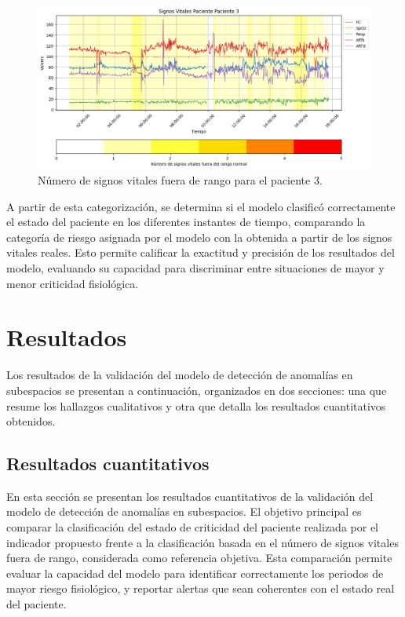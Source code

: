 \begin{figure}[H]
  \centering
  \includegraphics[width=\textwidth]{Images/patient3_signos_vitales_fuera_de_rango_2.png}
  \caption{Número de signos vitales fuera de rango para el paciente 3.}
  \label{fig:patient3_signos_vitales_fuera_de_rango}
\end{figure}

A partir de esta categorización, se determina si el modelo clasificó correctamente el estado del paciente en los diferentes instantes de tiempo, comparando la categoría de riesgo asignada por el modelo con la obtenida a partir de los signos vitales reales. Esto permite calificar la exactitud y precisión de los resultados del modelo, evaluando su capacidad para discriminar entre situaciones de mayor y menor criticidad fisiológica.

\section{Resultados}

Los resultados de la validación del modelo de detección de anomalías en subespacios se presentan a continuación, organizados en dos secciones: una que resume los hallazgos cualitativos y otra que detalla los resultados cuantitativos obtenidos.

\subsection{Resultados cuantitativos}

En esta sección se presentan los resultados cuantitativos de la validación del modelo de detección de anomalías en subespacios. El objetivo principal es comparar la clasificación del estado de criticidad del paciente realizada por el indicador propuesto frente a la clasificación basada en el número de signos vitales fuera de rango, considerada como referencia objetiva. Esta comparación permite evaluar la capacidad del modelo para identificar correctamente los periodos de mayor riesgo fisiológico, y reportar alertas que sean coherentes con el estado real del paciente.

